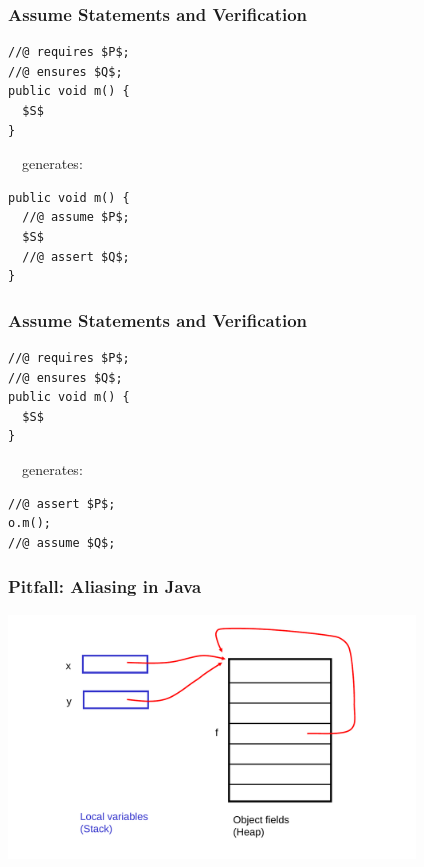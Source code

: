 \begin{frame}[fragile]
\frametitle{Assume Statements and Verification}

\begin{lstlisting}[mathescape=true]
//@ requires $P$;
//@ ensures $Q$;
public void m() {
  $S$
}
\end{lstlisting}

~~generates:

\begin{lstlisting}[mathescape=true]
public void m() {
  //@ assume $P$;
  $S$
  //@ assert $Q$;
}
\end{lstlisting}
\end{frame}

\begin{frame}[fragile]
\frametitle{Assume Statements and Verification}

\begin{lstlisting}[mathescape=true]
//@ requires $P$;
//@ ensures $Q$;
public void m() {
  $S$
}
\end{lstlisting}

~~generates:

\begin{lstlisting}[mathescape=true]
//@ assert $P$;
o.m();
//@ assume $Q$;
\end{lstlisting}

\end{frame}

\begin{frame}
\frametitle{Pitfall: Aliasing in Java}
\includegraphics[width=4.25in]{aliasxy}
\end{frame}

